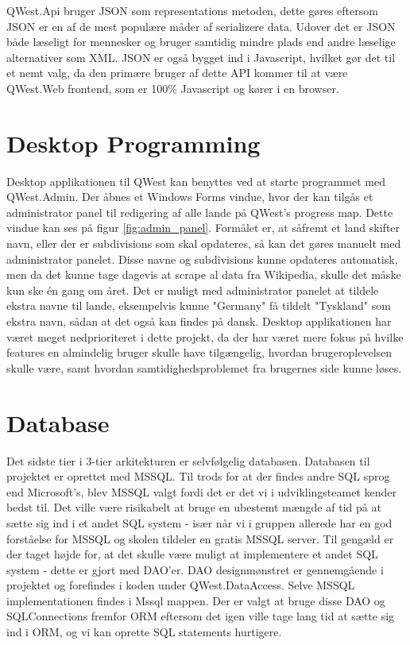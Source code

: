 QWest.Api bruger JSON\cite{json} som representations metoden, dette gøres eftersom JSON er en af de mest populære måder af serializere data. Udover det er JSON både læseligt for mennesker og bruger samtidig mindre plads end andre læselige alternativer som XML. JSON er også bygget ind i Javascript, hvilket gør det til et nemt valg, da den primære bruger af dette API kommer til at være QWest.Web frontend, som er 100\% Javascript og kører i en browser.

\section{Desktop Programming}\label{sec:deskProgramming}
Desktop applikationen til QWest kan benyttes ved at starte programmet med QWest.Admin. Der åbnes et Windows Forms\cite{WinForms} vindue, hvor der kan tilgås et administrator panel til redigering af alle lande på QWest's progress map. Dette vindue kan ses på figur \ref{fig:admin_panel}. Formålet er, at såfremt et land skifter navn, eller der er subdivisions som skal opdateres, så kan det gøres manuelt med administrator panelet. Disse navne og subdivisions kunne opdateres automatisk, men da det kunne tage dagevis at scrape al data fra Wikipedia, skulle det måske kun ske én gang om året. Det er muligt med administrator panelet at tildele ekstra navne til lande, eksempelvis kunne "Germany" få tildelt "Tyskland" som ekstra navn, sådan at det også kan findes på dansk.
Desktop applikationen har været meget nedprioriteret i dette projekt, da der har været mere fokus på hvilke features en almindelig bruger skulle have tilgængelig, hvordan brugeroplevelsen skulle være, samt hvordan samtidighedsproblemet fra brugernes side kunne løses.

\section{Database}\label{sec:databaseArc}
Det sidste tier i 3-tier arkitekturen er selvfølgelig databasen. Databasen til projektet er oprettet med MSSQL\cite{MSSQL}. Til trods for at der findes andre SQL sprog end Microsoft's, blev MSSQL valgt fordi det er det vi i udviklingsteamet kender bedst til. Det ville være risikabelt at bruge en ubestemt mængde af tid på at sætte sig ind i et andet SQL system - især når vi i gruppen allerede har en god forståelse for MSSQL og skolen tildeler en gratis MSSQL server. Til gengæld er der taget højde for, at det skulle være muligt at implementere et andet SQL system - dette er gjort med DAO'er. DAO\cite{dao} designmønstret er gennemgående i projektet og forefindes i koden under QWest.DataAccess. Selve MSSQL implementationen findes i Mssql mappen. Der er valgt at bruge disse DAO og SQLConnections fremfor ORM eftersom det igen ville tage lang tid at sætte sig ind i ORM, og vi kan oprette SQL statements hurtigere. %

